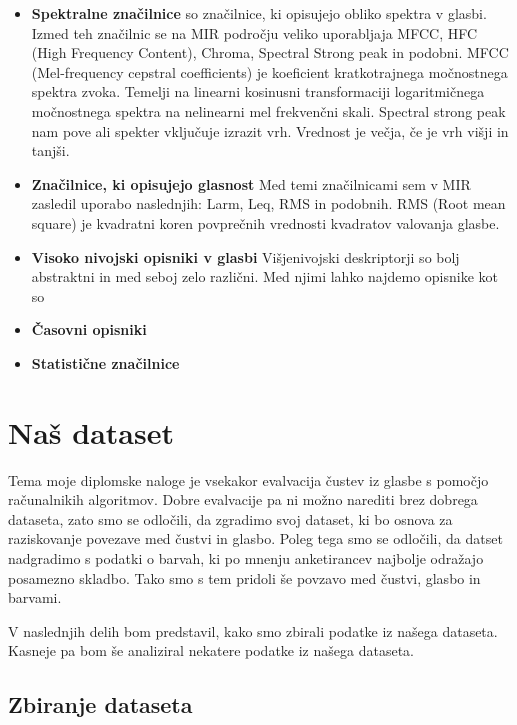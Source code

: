 \documentclass[a4paper, 12pt]{book}
\begin{document}
{\begin{itemize}
  \item \textbf{Spektralne značilnice} so značilnice, ki opisujejo obliko spektra v glasbi. Izmed teh značilnic se na MIR področju veliko uporabljaja MFCC, HFC (High Frequency Content), Chroma, Spectral Strong peak in podobni. 
MFCC \cite{gunderson2007musical} (Mel-frequency cepstral coefficients) je koeficient kratkotrajnega močnostnega spektra zvoka. Temelji na linearni kosinusni transformaciji logaritmičnega močnostnega spektra na nelinearni mel frekvenčni skali. Spectral strong peak \cite{gouyon2001exploration} nam pove ali spekter vključuje izrazit vrh. Vrednost je večja, če je vrh višji in tanjši. 
  \item \textbf{Značilnice, ki opisujejo glasnost} Med temi značilnicami sem v MIR zasledil uporabo naslednjih: Larm, Leq, RMS in podobnih. RMS (Root mean square) \cite{bausch1996root} je kvadratni koren povprečnih vrednosti kvadratov valovanja glasbe.
  \item \textbf{Visoko nivojski opisniki v glasbi} Višjenivojski deskriptorji so bolj abstraktni in med seboj zelo različni. Med njimi lahko najdemo opisnike kot so 
  \item \textbf{Časovni opisniki}
  \item \textbf{Statistične značilnice}
\end{itemize}

\chapter{Naš dataset}
\label{odatasetu}

Tema moje diplomske naloge je vsekakor evalvacija čustev iz glasbe s pomočjo računalnikih algoritmov. Dobre evalvacije pa ni možno narediti brez dobrega dataseta, zato smo se odločili, da zgradimo svoj dataset, ki bo osnova za raziskovanje povezave med čustvi in glasbo. Poleg tega smo se odločili, da datset nadgradimo s podatki o barvah, ki po mnenju anketirancev najbolje odražajo posamezno skladbo. Tako smo s tem pridoli še povzavo med čustvi, glasbo in barvami.

V naslednjih delih bom predstavil, kako smo zbirali podatke iz našega dataseta. Kasneje pa bom še analiziral nekatere podatke iz našega dataseta.

\section{Zbiranje dataseta}

}
\end{document}
